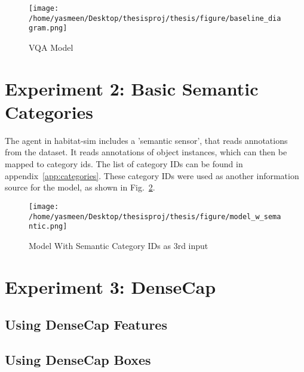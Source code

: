 \begin{figure}[h]
     \centering
     \texttt{[image: /home/yasmeen/Desktop/thesisproj/thesis/figure/baseline\_diagram.png]}
     \caption{VQA Model}
     \label{fig:baseline_model}
\end{figure}

\section{Experiment 2: Basic Semantic Categories}
\label{sec:exp_2}
The agent in habitat-sim includes a 'semantic sensor', that reads annotations from the dataset. It reads annotations of object instances, which can then be mapped to category ids. The list of category IDs can be found in appendix~\ref{app:categories}. These category IDs were used as another information source for the model, as shown in Fig.~\ref{fig:category_model}.

\begin{figure}[h]
     \centering
     \texttt{[image: /home/yasmeen/Desktop/thesisproj/thesis/figure/model\_w\_semantic.png]}
     \caption{Model With Semantic Category IDs as 3rd input}
     \label{fig:category_model}
\end{figure}

\section{Experiment 3: DenseCap}
\subsection{Using DenseCap Features}

\subsection{Using DenseCap Boxes}
